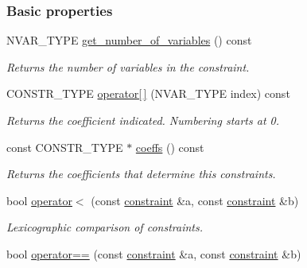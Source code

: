\subsubsection*{Basic properties}
\begin{DoxyCompactItemize}
\item 
\mbox{\label{group___c_l_s_solvers_a62f9d6527236b92bce67ef3251ba1fae}} 
N\+V\+A\+R\+\_\+\+T\+Y\+PE \hyperlink{group___c_l_s_solvers_a62f9d6527236b92bce67ef3251ba1fae}{get\+\_\+number\+\_\+of\+\_\+variables} () const
\begin{DoxyCompactList}\small\item\em Returns the number of variables in the constraint. \end{DoxyCompactList}\item 
\mbox{\label{group___c_l_s_solvers_aab075ba7c8fa216eff36aeee8fc5552e}} 
C\+O\+N\+S\+T\+R\+\_\+\+T\+Y\+PE \hyperlink{group___c_l_s_solvers_aab075ba7c8fa216eff36aeee8fc5552e}{operator\mbox{[}$\,$\mbox{]}} (N\+V\+A\+R\+\_\+\+T\+Y\+PE index) const
\begin{DoxyCompactList}\small\item\em Returns the coefficient indicated. Numbering starts at 0. \end{DoxyCompactList}\item 
\mbox{\label{group___c_l_s_solvers_ac70165b34389dbe7e58d757e1f16bd8d}} 
const C\+O\+N\+S\+T\+R\+\_\+\+T\+Y\+PE $\ast$ \hyperlink{group___c_l_s_solvers_ac70165b34389dbe7e58d757e1f16bd8d}{coeffs} () const
\begin{DoxyCompactList}\small\item\em Returns the coefficients that determine this constraints. \end{DoxyCompactList}\item 
bool \hyperlink{group___c_l_s_solvers_aecc988c4f28198ecc105f60eddfbfddc}{operator$<$} (const \hyperlink{group___c_l_s_solvers_classconstraint}{constraint} \&a, const \hyperlink{group___c_l_s_solvers_classconstraint}{constraint} \&b)
\begin{DoxyCompactList}\small\item\em Lexicographic comparison of constraints. \end{DoxyCompactList}\item 
bool \hyperlink{group___c_l_s_solvers_acb6f7858d12f0c03f1c8be86ecbef902}{operator==} (const \hyperlink{group___c_l_s_solvers_classconstraint}{constraint} \&a, const \hyperlink{group___c_l_s_solvers_classconstraint}{constraint} \&b)

\end{DoxyCompactItemize}
